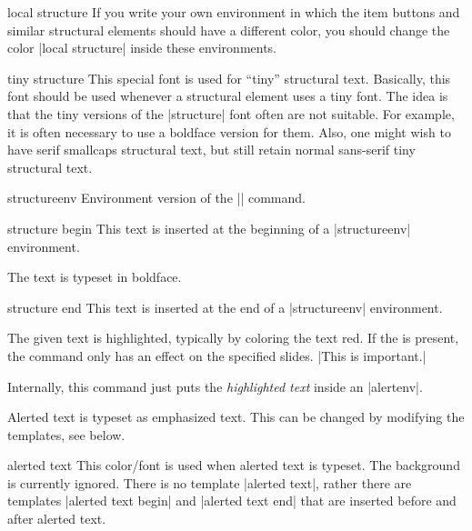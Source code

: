 \begin{command}{\structure{}}
\begin{element}{local structure}
    If you write your own environment in which the item buttons and similar structural elements should have a different color, you should change the color |local structure| inside these environments.
  \end{element}

  \begin{element}{tiny structure}\no\no\yes
    This special font is used for ``tiny'' structural text. Basically, this font should be used whenever a structural element uses a tiny font. The idea is that the tiny versions of the |structure| font often are not suitable. For example, it is often necessary to use a boldface version for them. Also, one might wish to have serif smallcaps structural text, but still retain normal sans-serif tiny structural text.
  \end{element}
\end{command}

\begin{environment}{{structureenv}}
  Environment version of the |\structure| command.

  \begin{element}{structure begin}\yes\no\no
    This text is inserted at the beginning of a |structureenv| environment.

    \begin{templateoptions}

      \articlenote
      The text is typeset in boldface.
    \end{templateoptions}
  \end{element}

  \begin{element}{structure end}\yes\no\no
    This text is inserted at the end of a |structureenv| environment.
  \end{element}
\end{environment}


\begin{command}{\alert{}}
  The given text is highlighted, typically by coloring the text red. If the  is present, the command only has an effect on the specified slides.
  \example
  |This is \alert{important}.|

  Internally, this command just puts the \emph{highlighted text} inside an |alertenv|.

  \articlenote
  Alerted text is typeset as emphasized text. This can be changed by modifying the templates, see below.

  \begin{element}{alerted text}\no\yes\yes
    This color/font is used when alerted text is typeset. The background is currently ignored. There is no template |alerted text|, rather there are templates |alerted text begin| and |alerted text end| that are inserted before and after alerted text.
  \end{element}
\end{command}

